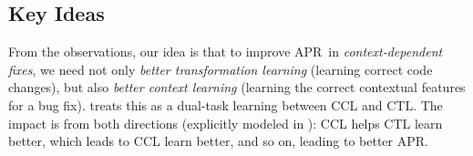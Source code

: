 
\subsection{Key Ideas}
\label{sec:key-idea}


From the observations, our idea is that to improve APR~in {\em
  context-dependent fixes}, we need not only {\em better
  transformation learning} (learning correct code changes), but
also {\em better context learning} (learning the correct contextual
features for a bug fix).
{\tool} treats this as a dual-task learning between CCL and
CTL. The impact is from both directions (explicitly modeled in {\tool}):
CCL helps CTL learn better, which leads to CCL learn better, and so on,
leading to better APR.







